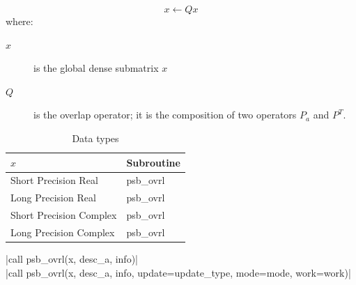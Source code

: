 \[ x \leftarrow Q x \]
where:
\begin{description}
\item[$x$] is the global dense submatrix $x$
\item[$Q$] is the overlap operator; it is the composition of two
operators $ P_a$ and $ P^{T}$. 
\end{description}

\begin{table}[h]
\begin{center}
\begin{tabular}{ll}
\hline
$x$ & {\bf Subroutine}\\
\hline
Short Precision Real & psb\_ovrl \\
Long Precision Real & psb\_ovrl \\
Short Precision Complex & psb\_ovrl \\
Long Precision Complex & psb\_ovrl \\
\hline
\end{tabular}
\end{center}
\caption{Data types\label{tab:f90ovrl}}
\end{table}

\noindent\fortinline|call psb_ovrl(x, desc_a, info)|\\
\fortinline|call psb_ovrl(x, desc_a, info, update=update_type, mode=mode, work=work)|

